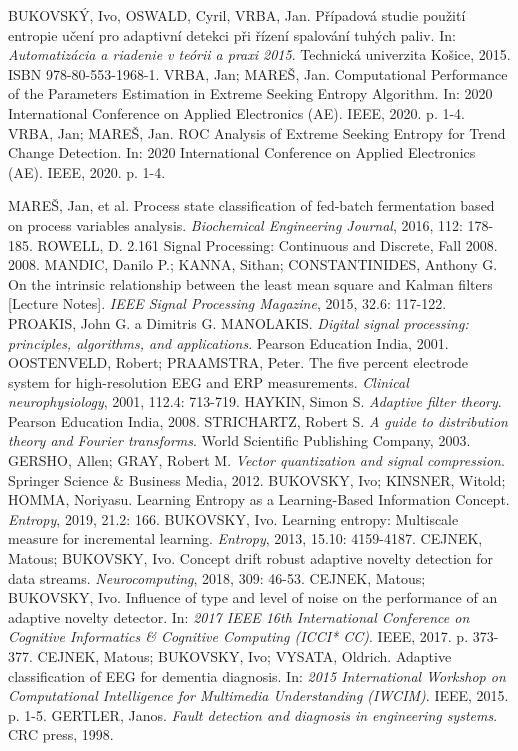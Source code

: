 \documentclass[11pt,twoside,openright]{report}
\begin{document}
\begin{thebibliography}{A}
BUKOVSKÝ, Ivo, OSWALD, Cyril, VRBA, Jan. Případová studie použití entropie učení pro adaptivní detekci při řízení spalování tuhých paliv. In: \textit{Automatizácia a riadenie v teórii a praxi 2015}. Technická univerzita Košice, 2015. ISBN 978-80-553-1968-1.
VRBA, Jan; MAREŠ, Jan. Computational Performance of the Parameters Estimation in Extreme Seeking Entropy Algorithm. In: 2020 International Conference on Applied Electronics (AE). IEEE, 2020. p. 1-4.
VRBA, Jan; MAREŠ, Jan. ROC Analysis of Extreme Seeking Entropy for Trend Change Detection. In: 2020 International Conference on Applied Electronics (AE). IEEE, 2020. p. 1-4.
\end{thebibliography}


\renewcommand{\bibname}{Literatura}
\begin{thebibliography}{L}

MAREŠ, Jan, et al. Process state classification of fed-batch fermentation based on process variables analysis. \textit{Biochemical Engineering Journal}, 2016, 112: 178-185.
ROWELL, D. 2.161 Signal Processing: Continuous and Discrete, Fall 2008. 2008.
MANDIC, Danilo P.; KANNA, Sithan; CONSTANTINIDES, Anthony G. On the intrinsic relationship between the least mean square and Kalman filters [Lecture Notes]. \textit{IEEE Signal Processing Magazine}, 2015, 32.6: 117-122.
PROAKIS, John G. a Dimitris G. MANOLAKIS. \textit{Digital signal processing: principles, algorithms, and applications}. Pearson Education India, 2001.
OOSTENVELD, Robert; PRAAMSTRA, Peter. The five percent electrode system for high-resolution EEG and ERP measurements. \textit{Clinical neurophysiology}, 2001, 112.4: 713-719.
HAYKIN, Simon S. \textit{Adaptive filter theory}. Pearson Education India, 2008.
STRICHARTZ, Robert S. \textit{A guide to distribution theory and Fourier transforms}. World Scientific Publishing Company, 2003.
GERSHO, Allen; GRAY, Robert M. \textit{Vector quantization and signal compression}. Springer Science \& Business Media, 2012.
BUKOVSKY, Ivo; KINSNER, Witold; HOMMA, Noriyasu. Learning Entropy as a Learning-Based Information Concept. \textit{Entropy}, 2019, 21.2: 166.
BUKOVSKY, Ivo. Learning entropy: Multiscale measure for incremental learning. \textit{Entropy}, 2013, 15.10: 4159-4187.
CEJNEK, Matous; BUKOVSKY, Ivo. Concept drift robust adaptive novelty detection for data streams. \textit{Neurocomputing}, 2018, 309: 46-53.
 CEJNEK, Matous; BUKOVSKY, Ivo. Influence of type and level of noise on the performance of an adaptive novelty detector. In: \textit{2017 IEEE 16th International Conference on Cognitive Informatics \& Cognitive Computing (ICCI* CC)}. IEEE, 2017. p. 373-377.
CEJNEK, Matous; BUKOVSKY, Ivo; VYSATA, Oldrich. Adaptive classification of EEG for dementia diagnosis. In: \textit{2015 International Workshop on Computational Intelligence for Multimedia Understanding (IWCIM)}. IEEE, 2015. p. 1-5.
GERTLER, Janos. \textit{Fault detection and diagnosis in engineering systems}. CRC press, 1998.


\end{thebibliography}
\end{document}
